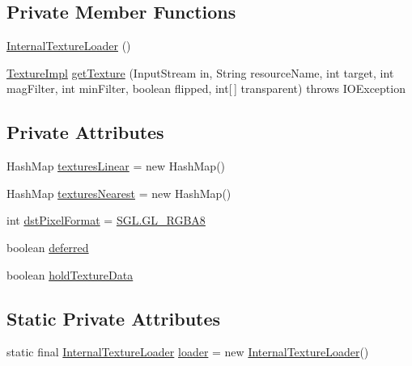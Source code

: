 \subsection*{Private Member Functions}
\begin{DoxyCompactItemize}
\item 
\mbox{\hyperlink{classorg_1_1newdawn_1_1slick_1_1opengl_1_1_internal_texture_loader_a899c615acad92686e53288960ec9e982}{Internal\+Texture\+Loader}} ()
\item 
\mbox{\hyperlink{classorg_1_1newdawn_1_1slick_1_1opengl_1_1_texture_impl}{Texture\+Impl}} \mbox{\hyperlink{classorg_1_1newdawn_1_1slick_1_1opengl_1_1_internal_texture_loader_a3b0ac135ea1ae7f431458f15ca702d56}{get\+Texture}} (Input\+Stream in, String resource\+Name, int target, int mag\+Filter, int min\+Filter, boolean flipped, int\mbox{[}$\,$\mbox{]} transparent)  throws I\+O\+Exception      
\end{DoxyCompactItemize}
\subsection*{Private Attributes}
\begin{DoxyCompactItemize}
\item 
Hash\+Map \mbox{\hyperlink{classorg_1_1newdawn_1_1slick_1_1opengl_1_1_internal_texture_loader_af5ded371f9b982d890be25766fb2ba46}{textures\+Linear}} = new Hash\+Map()
\item 
Hash\+Map \mbox{\hyperlink{classorg_1_1newdawn_1_1slick_1_1opengl_1_1_internal_texture_loader_a2212ea841053c4380293000579d0a068}{textures\+Nearest}} = new Hash\+Map()
\item 
int \mbox{\hyperlink{classorg_1_1newdawn_1_1slick_1_1opengl_1_1_internal_texture_loader_a38647f15e90386d1a6a3c398f1766611}{dst\+Pixel\+Format}} = \mbox{\hyperlink{interfaceorg_1_1newdawn_1_1slick_1_1opengl_1_1renderer_1_1_s_g_l_a015ce5deda3c63768e9784f5132cfc17}{S\+G\+L.\+G\+L\+\_\+\+R\+G\+B\+A8}}
\item 
boolean \mbox{\hyperlink{classorg_1_1newdawn_1_1slick_1_1opengl_1_1_internal_texture_loader_afde58d084fb7c587c15b674005617ff4}{deferred}}
\item 
boolean \mbox{\hyperlink{classorg_1_1newdawn_1_1slick_1_1opengl_1_1_internal_texture_loader_a45b8c17af18ad5095972b3f519eb17bd}{hold\+Texture\+Data}}
\end{DoxyCompactItemize}
\subsection*{Static Private Attributes}
\begin{DoxyCompactItemize}
\item 
static final \mbox{\hyperlink{classorg_1_1newdawn_1_1slick_1_1opengl_1_1_internal_texture_loader}{Internal\+Texture\+Loader}} \mbox{\hyperlink{classorg_1_1newdawn_1_1slick_1_1opengl_1_1_internal_texture_loader_aebc26e4ad3aef900e65a4f21436de165}{loader}} = new \mbox{\hyperlink{classorg_1_1newdawn_1_1slick_1_1opengl_1_1_internal_texture_loader}{Internal\+Texture\+Loader}}()
\end{DoxyCompactItemize}


